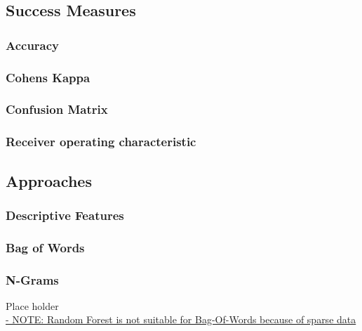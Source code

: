 			
			
	
	\subsection{Success Measures}
	
		\subsubsection{Accuracy}
		
		\subsubsection{Cohens Kappa}
		
		\subsubsection{Confusion Matrix}
		
		\subsubsection{Receiver operating characteristic}
	
	\subsection{Approaches}
	
		\subsubsection{Descriptive Features}
		
		\subsubsection{Bag of Words}
		
		\subsubsection{N-Grams}




	{\color{red} \Large Place holder} \\
	\hyperref{http://fastml.com/classifying-text-with-bag-of-words-a-tutorial/}{category}{name}{
		- NOTE: Random Forest is not suitable for Bag-Of-Words because of sparse data
	}
	